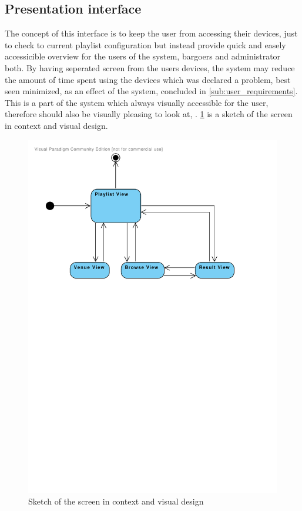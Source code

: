 \subsection{Presentation interface}

The concept of this interface is to keep the user from accessing their devices, just to check to current playlist configuration but instead provide quick and easely accessicible overview for the users of the system, bargoers and administrator both. By having seperated screen from the users devices, the system may reduce the amount of time spent using the devices which was declared a problem, best seen minimized, as an effect of the system, concluded in \cref{sub:user_requirements}. 
This is a part of the system which always visually accessible for the user, therefore should also be visually pleasing to look at, . \cref{fig:PresentationInterface} is a sketch of the screen in context and visual design. 

\begin{figure}
  \centering
  \includegraphics[width=1.0\linewidth]{Images/UserInterface.pdf}
  \caption{Sketch of the screen in context and visual design}\label{fig:PresentationInterface}
\end{figure}